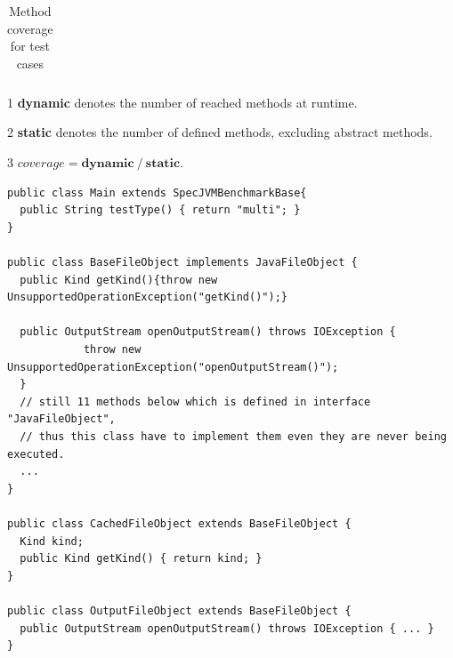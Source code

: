 \documentclass{fac}
\begin{document}
\begin{table}
\begin{tabular*}{1.01\textwidth}{|l|c|c|c|c|c|c|c|c|c|c|c|c|}
\hline
\end{tabular*}
\begin{tablenotes}
  \item[1] \textbf{dynamic} denotes the number of reached methods at runtime.
  \item[2] \textbf{static} denotes the number of defined methods, excluding abstract methods.
  \item[3] $\textit{coverage} = \textbf{dynamic}\ /\ \textbf{static}$.
\end{tablenotes}
\caption{Method coverage for test cases}\label{table:coverage}
\end{table}





\begin{minipage}{\linewidth}
\begin{lstlisting}[caption={Example code for uncovered methods },label={lst:uncovered-method}]
public class Main extends SpecJVMBenchmarkBase{
  public String testType() { return "multi"; }
}

public class BaseFileObject implements JavaFileObject {
  public Kind getKind(){throw new UnsupportedOperationException("getKind()");}
		
  public OutputStream openOutputStream() throws IOException {
			throw new UnsupportedOperationException("openOutputStream()");
  }
  // still 11 methods below which is defined in interface "JavaFileObject",
  // thus this class have to implement them even they are never being executed.
  ...
}

public class CachedFileObject extends BaseFileObject {		
  Kind kind;	
  public Kind getKind() { return kind; }
}

public class OutputFileObject extends BaseFileObject {
  public OutputStream openOutputStream() throws IOException { ... }
}
\end{lstlisting}
\end{minipage}
\end{document}
